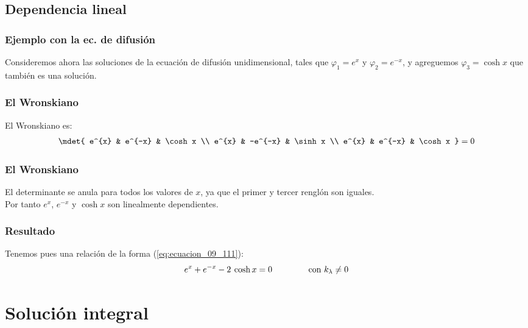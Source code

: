 \subsection{Dependencia lineal}
\begin{frame}
\frametitle{Ejemplo con la ec. de difusión}
Consideremos ahora las soluciones de la ecuación de difusión unidimensional, tales que $\varphi_{1} = e^{x}$ y $\varphi_{2} = e^{-x}$, y agreguemos $\varphi_{3} = \cosh x$ que también es una solución. 
\end{frame}
\begin{frame}
\frametitle{El Wronskiano}
El Wronskiano es:
\begin{align*}
\mdet{
e^{x}  & e^{-x} & \cosh x \\
e^{x}  & -e^{-x} & \sinh x \\
e^{x}  & e^{-x} & \cosh x
} = 0
\end{align*}
\end{frame}
\begin{frame}
\frametitle{El Wronskiano}
El determinante se anula para todos los valores de $x$, ya que el primer y tercer renglón son iguales.
\\
\bigskip
Por tanto $e^{x}$, $e^{-x}$ y $\cosh x$ son linealmente dependientes.
\end{frame}
\begin{frame}
\frametitle{Resultado}
Tenemos pues una relación de la forma (\ref{eq:ecuacion_09_111}):
\begin{align*}
e^{x} + e^{-x} - 2 \: \cosh x = 0 \hspace{1.5cm} \text{con } k_{\lambda} \neq 0
\end{align*}
\end{frame}
\section{Solución integral}
